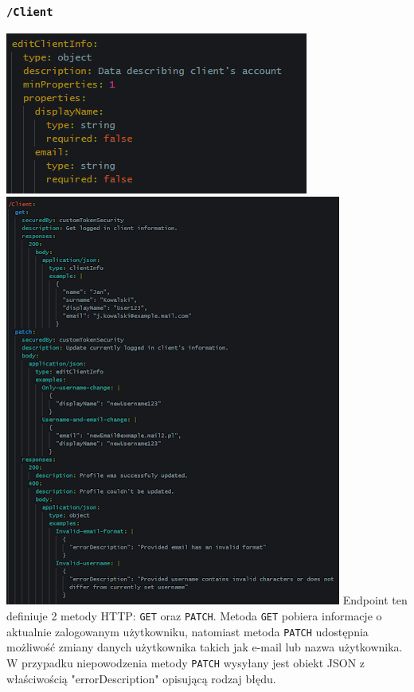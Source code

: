 \documentclass{article}
\begin{document}
\subsubsection{\texttt{/Client}}

\includegraphics[width=\linewidth]{Client login + authentication/client_info_type.png}
\newpage
\includegraphics[width=\linewidth]{Client login + authentication/client_info.png}
\indent Endpoint ten definiuje 2 metody HTTP: \texttt{GET} oraz \texttt{PATCH}. Metoda \texttt{GET} pobiera informacje o aktualnie zalogowanym użytkowniku, natomiast metoda \texttt{PATCH} udostępnia możliwość zmiany danych użytkownika takich jak e-mail lub nazwa użytkownika. W przypadku niepowodzenia metody \texttt{PATCH} wysyłany jest obiekt JSON z właściwością "errorDescription" opisującą rodzaj błędu.
\end{document}
